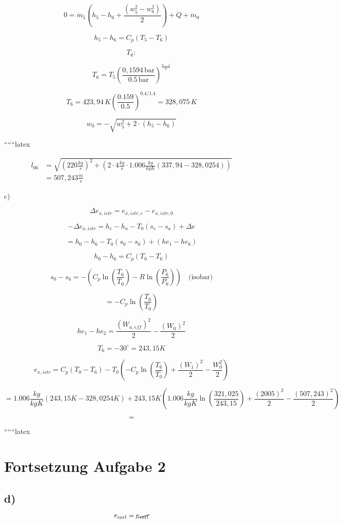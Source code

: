\[
0 = \dot{m}_5 (h_5 - h_6 + \frac{(w_5^2 - w_6^2)}{2}) + \dot{Q} + \dot{m}_0
\]

\[
h_5 - h_6 = C_p (T_5 - T_6)
\]

\[
T_6:
\]

\[
T_6 = T_5 \left( \frac{0,1594 \, \text{bar}}{0.5 \, \text{bar}} \right)^{\frac{n-1}{n}}
\]

\[
T_6 = 423,94 \, K \left( \frac{0.159}{0.5} \right)^{0.4/1.4} = 328,075 \, K
\]

\[
w_0 = -\sqrt{w_5^2 + 2 \cdot (h_5 - h_6)}
\]

``````latex


\[
\begin{aligned}
    l_{06} &= \sqrt{(220 \frac{kg}{s})^2 + (2 \cdot 4 \frac{kg}{s} \cdot 1.006 \frac{kg}{kgK} (337,94 - 328,0254))} \\
    &= 507,243 \frac{m}{s}
\end{aligned}
\]

c)

\[
\Delta e_{x,istr} = e_{x,istr,e} - e_{x,istr,0}
\]

\[
-\Delta e_{x,istr} = h_e - h_a - T_0 (s_e - s_a) + \Delta e
\]

\[
= h_0 - h_6 - T_0 (s_0 - s_6) + (he_1 - he_6)
\]

\[
h_0 - h_6 = C_p (T_0 - T_6)
\]

\[
s_0 - s_6 = - \left( C_p \ln \left( \frac{T_6}{T_0} \right) - R \ln \left( \frac{P_6}{P_0} \right) \right) \quad \text{(isobar)}
\]

\[
= - C_p \ln \left( \frac{T_6}{T_0} \right)
\]

\[
he_1 - he_2 = \frac{(W_{u,eff})^2}{2} - \frac{(W_0)^2}{2}
\]

\[
T_6 = -30^\circ = 243,15 K
\]

\[
e_{x,istr} = C_p (T_0 - T_6) - T_0 \left( -C_p \ln \left( \frac{T_6}{T_0} \right) + \frac{(W_1)^2}{2} - \frac{W_0^2}{2} \right)
\]

\[
= 1.006 \frac{kg}{kgK} (243,15 K - 328,0254 K) + 243,15 K \left( 1.006 \frac{kg}{kgK} \ln \left( \frac{321,025}{243,15} \right) + \frac{(2005)^2}{2} - \frac{(507,243)^2}{2} \right)
\]

\[
=
\]

``````latex


\section*{Fortsetzung Aufgabe 2}

\subsection*{d)}
\[
e_{\text{verl}} = \cancel{e_{\text{verl}}}
\]

